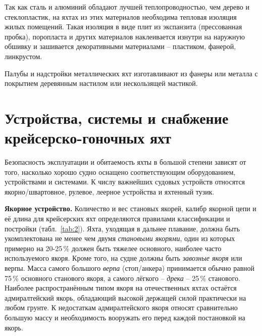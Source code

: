 Так как сталь и алюминий обладают лучшей теплопроводностью, чем дерево
и стеклопластик, на яхтах из этих материалов необходима тепловая
изоляция жилых помещений. Такая изоляция в виде плит из экспанзита
(прессованная пробка), поропласта и других материалов наклеивается
изнутри на наружную обшивку и зашивается декоративными материалами
\--- пластиком, фанерой, линкрустом.

Палубы и надстройки металлических яхт изготавливают из фанеры или
металла с покрытием деревянным настилом или нескользящей мастикой.

\section{Устройства, системы и снабжение крейсерско-гоночных яхт}

Безопасность эксплуатации и обитаемость яхты в большой степени зависят
от того, насколько хорошо судно оснащено соответствующим
оборудованием, устройствами и системами. К числу важнейших судовых
устройств относятся якорно\-/швартовное, рулевое, леерное устройства и
яхтенный тузик.

\textbf{Якорное устройство.}
 Количество и вес становых якорей, калибр якорной цепи и
её длина для крейсерских яхт определяются правилами классификации и
постройки (табл.~\ref{tab:2}). Яхта, уходящая в дальнее плавание,
должна быть укомплектована не менее чем двумя \textit{становыми
якорями}, один из которых примерно на 20-25\,\%
должен быть тяжелее основного, наиболее часто используемого
якоря. Кроме того, на судне должны быть \textit{завозные
якоря} или верпы. Масса самого большого
\textit{верпа} (стоп\-/анкера) принимается обычно равной 75\,\%
основного станового якоря, а самого лёгкого \--- \textit{дрека}
\--- 25\,\% станового.  Наиболее распространённым типом якоря на
отечественных яхтах остаётся адмиралтейский якорь, обладающий высокой
держащей силой практически на любом грунте. К недостаткам
адмиралтейского якоря относят сравнительно большую массу и
необходимость вооружать его перед каждой постановкой на якорь.

